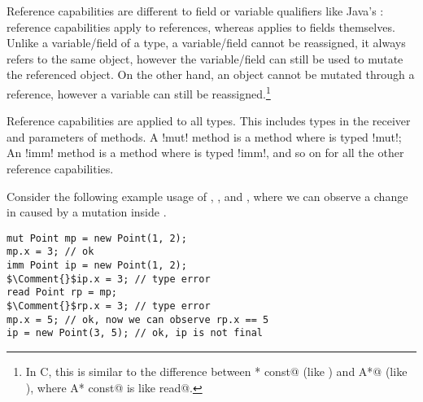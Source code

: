 Reference capabilities are different to field or variable qualifiers like Java's \Q@final@: reference capabilities apply to references, whereas \Q@final@ applies to fields themselves. Unlike a variable/field of a \Q@read@ type, a \Q@final@ variable/field cannot be reassigned, it always refers to the same object, however the variable/field can still be used to mutate the referenced object.
On the other hand, an object cannot be mutated through a \Q@read@ reference, however a \Q@read@ variable can still be reassigned.\footnote{In C, this is similar to the difference between \Q@A* const@ (like \Q@final@) and \Q@const A*@ (like \Q@read@), where \Q@const A* const@ is like \Q@final read@.}

Reference capabilities are applied to all types. This includes types in the receiver and parameters of methods.
A \Q!mut! method is a method where \Q@this@ is typed \Q!mut!;
An \Q!imm! method is a method where \Q@this@ is typed \Q!imm!, and so on for all the other reference capabilities.


Consider the following  example usage of \Q@mut@, \Q@imm@, and \Q@read@, where we can observe a change in \Q@rp@ caused by a mutation inside \Q@mp@.
\begin{lstlisting}
mut Point mp = new Point(1, 2);
mp.x = 3; // ok
imm Point ip = new Point(1, 2);
$\Comment{}$ip.x = 3; // type error
read Point rp = mp;
$\Comment{}$rp.x = 3; // type error
mp.x = 5; // ok, now we can observe rp.x == 5
ip = new Point(3, 5); // ok, ip is not final
\end{lstlisting} 

